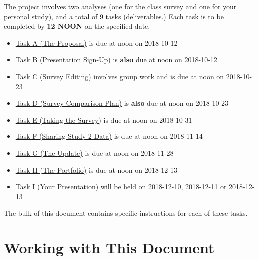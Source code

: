 \documentclass[]{book}
\providecommand{\tightlist}{%
  \setlength{\itemsep}{0pt}\setlength{\parskip}{0pt}}
\theoremstyle{definition}
\theoremstyle{definition}
\theoremstyle{definition}
\theoremstyle{remark}
\begin{document}
The project involves two analyses (one for the class survey and one for
your personal study), and a total of 9 tasks (deliverables.) Each task
is to be completed by \textbf{12 NOON} on the specified date.

\begin{itemize}
\tightlist
\item
  \protect\hyperlink{taskA}{Task A (The Proposal)} is due at noon on
  2018-10-12
\item
  \protect\hyperlink{taskB}{Task B (Presentation Sign-Up)} is
  \textbf{also} due at noon on 2018-10-12
\item
  \protect\hyperlink{taskC}{Task C (Survey Editing)} involves group work
  and is due at noon on 2018-10-23
\item
  \protect\hyperlink{taskD}{Task D (Survey Comparison Plan)} is
  \textbf{also} due at noon on 2018-10-23
\item
  \protect\hyperlink{taskE}{Task E (Taking the Survey)} is due at noon
  on 2018-10-31
\item
  \protect\hyperlink{taskF}{Task F (Sharing Study 2 Data)} is due at
  noon on 2018-11-14
\item
  \protect\hyperlink{taskG}{Task G (The Update)} is due at noon on
  2018-11-28
\item
  \protect\hyperlink{taskH}{Task H (The Portfolio)} is due at noon on
  2018-12-13
\item
  \protect\hyperlink{taskI}{Task I (Your Presentation)} will be held on
  2018-12-10, 2018-12-11 or 2018-12-13
\end{itemize}

The bulk of this document contains specific instructions for each of
these tasks.

\hypertarget{working-with-this-document}{%
\section*{Working with This Document}\label{working-with-this-document}}
\end{document}
